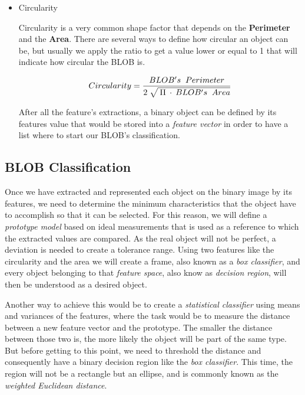 \begin{itemize}
\item Circularity

Circularity is a very common shape factor that depends on the \textbf{Perimeter} and the \textbf{Area}. There are several ways to define how circular an object can be, but usually we apply the ratio to get a value lower or equal to 1 that will indicate how circular the BLOB is.

\begin{equation}	
	\begin{aligned}
	{Circularity}=\displaystyle\frac{BLOB's \;\; Perimeter}{2 \; \sqrt{\mathstrut \: \Pi \: \cdot \: {BLOB's \;\; Area}}}
	\label{Circularity}
	\end{aligned}
\end{equation}

After all the feature's extractions, a binary object can be defined by its features value that would be stored into a \textit{feature vector} in order to have a list where to start our BLOB's classification.

\end{itemize}



\subsection{BLOB Classification}

Once we have extracted and represented each object on the binary image by its features, we need to determine the minimum characteristics that the object have to accomplish so that it can be selected.
For this reason, we will define a \textit{prototype model} based on ideal measurements that is used as a reference to which the extracted values are compared. As the real object will not be perfect, a deviation is needed to create a tolerance range.
Using two features like the circularity and the area we will create a frame, also known as a \textit{box classifier}, and every object belonging to that \textit{feature space}, also know as \textit{decision region}, will then be understood as a desired object.

Another way to achieve this would be to create a \textit{statistical classifier} using means and variances of the features, where the task would be to measure the distance between a new feature vector and the prototype. The smaller the distance between those two is, the more likely the object will be part of the same type. But before getting to this point, we need to threshold the distance and consequently have a binary decision region like the \textit{box classifier}.
This time, the region will not be a rectangle but an ellipse, and is commonly known as the \textit{weighted Euclidean distance}.

